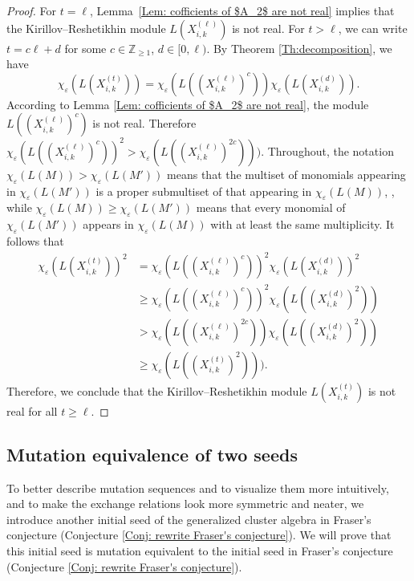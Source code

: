 \documentclass[11pt, reqno]{amsart}
\theoremstyle{plain}
\theoremstyle{definition}
\numberwithin{equation}{section}
\begin{document}
\begin{proof}
For $t=\ell$, Lemma~\ref{Lem: cofficients of $A_2$ are not real} implies that the Kirillov--Reshetikhin module $L(X^{(\ell)}_{i,k})$ is not real. For $t>\ell$, we can write $t=c \ell+d$ for some $c\in \mathbb{Z}_{\geq 1}$, $d\in[0, \ell)$. By Theorem \ref{Th:decomposition}, we have
\[
\chi_{\varepsilon}(L(X^{(t)}_{i, k}))=\chi_{\varepsilon}(L((X^{(\ell)}_{i, k})^c)) \chi_{\varepsilon}(L(X^{(d)}_{i, k})).
\]
According to Lemma \ref{Lem: cofficients of $A_2$ are not real}, the module $L((X^{(\ell)}_{i, k})^c)$ is not real. Therefore $ \chi_\varepsilon(L((X^{(\ell)}_{i, k})^c))^2>\chi_\varepsilon(L((X^{(\ell)}_{i, k})^{2c})))$. Throughout, the notation
$\chi_\varepsilon(L(M))>\chi_\varepsilon(L(M'))$
means that the multiset of monomials appearing in
$\chi_\varepsilon(L(M'))$ is a proper submultiset of that appearing in
$\chi_\varepsilon(L(M))$, , while $\chi_\varepsilon(L(M))\ge \chi_\varepsilon(L(M'))$ means that every monomial of $\chi_\varepsilon(L(M'))$ appears in $\chi_\varepsilon(L(M))$ with at least the same multiplicity. It follows that
\begin{align*}
\chi_{\varepsilon}(L(X^{(t)}_{i, k}))^2 &= \chi_{\varepsilon}(L((X^{(\ell)}_{i, k})^c))^2\chi_{\varepsilon}(L(X^{(d)}_{i, k}))^2\\
&\ge \chi_{\varepsilon}(L((X^{(\ell)}_{i, k})^c))^2 \chi_{\varepsilon}(L((X^{(d)}_{i, k})^2))\\ 
&>\chi_{\varepsilon}(L((X^{(\ell)}_{i, k})^{2c})) \chi_{\varepsilon}(L((X^{(d)}_{i, k})^2))\\
&\ge \chi_{\varepsilon}(L((X^{(t)}_{i, k})^2))).
\end{align*}
Therefore, we conclude that the Kirillov--Reshetikhin module $L(X^{(t)}_{i, k})$ is not real for all $t \ge \ell$.
\end{proof}


\subsection{\texorpdfstring{Mutation equivalence of two seeds}{Mutation equivalence of cluster variables}}

To better describe mutation sequences and to visualize them more intuitively, and to make the exchange relations look more symmetric and neater, we introduce another initial seed of the generalized cluster algebra in Fraser’s conjecture (Conjecture \ref{Conj: rewrite Fraser's conjecture}). We will prove that this initial seed is mutation equivalent to the initial seed in Fraser’s conjecture (Conjecture \ref{Conj: rewrite Fraser's conjecture}).
\end{document}
